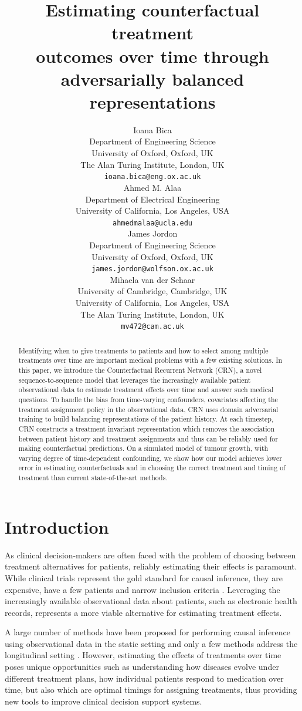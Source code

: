 \documentclass{article} %
\title{Estimating counterfactual treatment \\ outcomes over time through adversarially balanced representations}
\author{Ioana Bica \\
Department of Engineering Science\\
University of Oxford, Oxford, UK\\
The Alan Turing Institute, London, UK \\
\texttt{ioana.bica@eng.ox.ac.uk} \\
\And
Ahmed M. Alaa \\
Department of Electrical Engineering \\
University of California, Los Angeles, USA \\
\texttt{ahmedmalaa@ucla.edu} \\
\AND
James Jordon \\
Department of Engineering Science\\
University of Oxford, Oxford, UK\\
\texttt{james.jordon@wolfson.ox.ac.uk} \\
\And
Mihaela van der Schaar \\
University of Cambridge, Cambridge, UK\\
University of California, Los Angeles, USA \\
The Alan Turing Institute, London, UK \\
\texttt{mv472@cam.ac.uk} \\
}
\begin{document}
\maketitle

\begin{abstract}
Identifying when to give treatments to patients and how to select among multiple treatments over time are important medical problems with a few existing solutions. In this paper, we introduce the Counterfactual Recurrent Network (CRN), a novel sequence-to-sequence model that leverages the increasingly available patient observational data to estimate treatment effects over time and answer such medical questions. To handle the bias from time-varying confounders, covariates affecting the treatment assignment policy in the observational data, CRN uses domain adversarial training to build balancing representations of the patient history. At each timestep, CRN constructs a treatment invariant representation which removes the association between patient history and treatment assignments and thus can be reliably used for making counterfactual predictions. On a simulated model of tumour growth, with varying degree of time-dependent confounding, we show how our model achieves lower error in estimating counterfactuals and in choosing the correct treatment and timing of treatment than current state-of-the-art methods.
\end{abstract}


	\section{Introduction}	
	As clinical decision-makers are often faced with the problem of choosing between treatment alternatives for patients, reliably estimating their effects is paramount. While clinical trials represent the gold standard for causal inference, they are expensive, have a few patients and narrow inclusion criteria \citep{booth2014randomised}. Leveraging the increasingly available observational data about patients, such as electronic health records, represents a more viable alternative for estimating treatment effects. 
	
	A large number of methods have been proposed for performing causal inference using observational data in the static setting \citep{johansson2016learning, shalit2017estimating, alaa2017bayesian, li2017matching, yoon2018ganite, alaa2018limits, yao2018representation} and only a few methods address the longitudinal setting \citep{xu2016bayesian, roy2016bayesian, soleimani2017treatment, schulam2017reliable, lim2018forecasting}. However, estimating the effects of treatments over time poses unique opportunities such as understanding how diseases evolve under different treatment plans, how individual patients respond to medication over time, but also which are optimal timings for assigning treatments, thus providing new tools to improve clinical decision support systems. 
		
\end{document}
